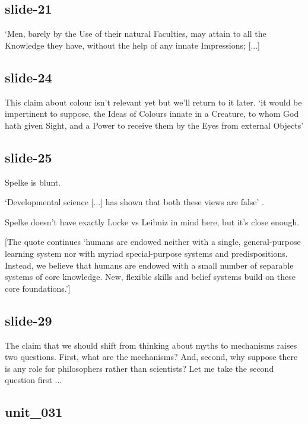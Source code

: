 \documentclass[12pt,\papersize]{extarticle}
\begin{document}
 
 
\subsection{slide-21}
‘Men, barely by the Use of their natural Faculties, may attain to all the Knowledge they have, without the help of any innate Impressions; [...]
 
 
 
\subsection{slide-24}
This claim about colour isn't relevant yet but we'll return to it later.
‘it would be impertinent to suppose, the Ideas of Colours innate in a Creature, to whom God hath given Sight, and a Power to receive them by the Eyes from external Objects’
\citep[p.\ 48]{Locke:1975qo}
 
 
 
\subsection{slide-25}
Spelke is blunt.
 
‘Developmental science [...] has shown that both these views are false’
\citep[p.\ 89]{Spelke:2007hb}.
 
Spelke doesn't have exactly Locke vs Leibniz in mind here, but it's close enough.
 
[The quote continues ‘humans are endowed neither with a single, general-purpose learning system nor with myriad special-purpose systems and predispositions. Instead, we believe that humans are endowed with a small number of separable systems of core knowledge. New, flexible skills and belief systems build on these core foundations.’]
 
 
 
\subsection{slide-29}
The claim that we should shift from thinking about myths to mechanisms raises two questions. First, what are the mechanisms? And, second, why suppose there is any role for philosophers rather than scientists? Let me take the second question first ...
 
 
 
\subsection{unit\_031}
 
\end{document}
